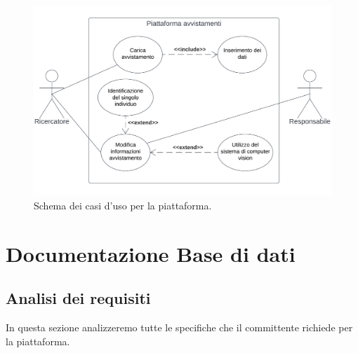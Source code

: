 \documentclass[a4paper,final,12pt]{report}
\begin{document}
\begin{figure}[hbtp]
\centering
\includegraphics[scale=0.6]{img_concettuale/casi.png}
\caption{Schema dei casi d'uso per la piattaforma.}
\end{figure}


\chapter{Documentazione Base di dati}
\section{Analisi dei requisiti}
In questa sezione analizzeremo tutte le specifiche che il committente richiede per la piattaforma.
\end{document}
